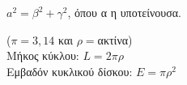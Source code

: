 \documentclass[a4paper,landscape,2pt]{book}
\begin{document}
\begin{multicols}{3}

\mybullet $a^2=\beta^2+\gamma^2$, όπου α η υποτείνουσα. \\



($\pi=3,14$ και $\rho=$ακτίνα) \\
\mybullet Μήκος κύκλου: $L=2\pi\rho$ \\
\mybullet Εμβαδόν κυκλικού δίσκου: $E=\pi\rho^2$ \\

\end{multicols}


\end{document}
